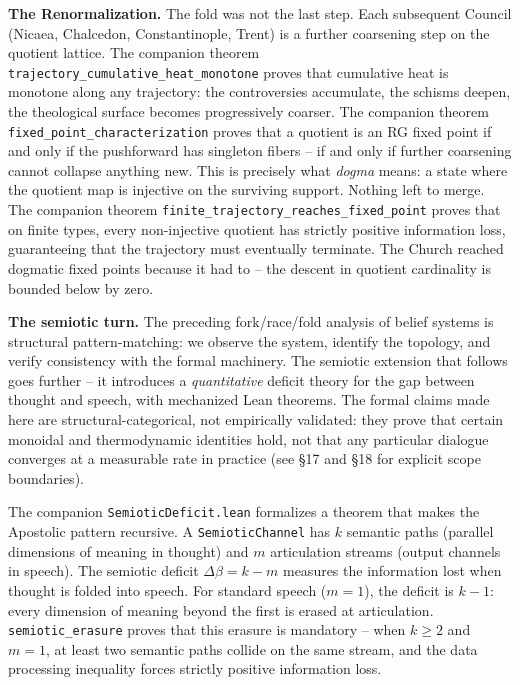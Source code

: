 \documentclass[
  11pt,
]{article}
\begin{document}
\textbf{The Renormalization.} The fold was not the last step. Each
subsequent Council (Nicaea, Chalcedon, Constantinople, Trent) is a
further coarsening step on the quotient lattice. The companion theorem
\texttt{trajectory\_cumulative\_heat\_monotone} proves that cumulative
heat is monotone along any trajectory: the controversies accumulate, the
schisms deepen, the theological surface becomes progressively coarser.
The companion theorem \texttt{fixed\_point\_characterization} proves
that a quotient is an RG fixed point if and only if the pushforward has
singleton fibers -- if and only if further coarsening cannot collapse
anything new. This is precisely what \emph{dogma} means: a state where
the quotient map is injective on the surviving support. Nothing left to
merge. The companion theorem
\texttt{finite\_trajectory\_reaches\_fixed\_point} proves that on finite
types, every non-injective quotient has strictly positive information
loss, guaranteeing that the trajectory must eventually terminate. The
Church reached dogmatic fixed points because it had to -- the descent in
quotient cardinality is bounded below by zero.

\textbf{The semiotic turn.} The preceding fork/race/fold analysis of
belief systems is structural pattern-matching: we observe the system,
identify the topology, and verify consistency with the formal machinery.
The semiotic extension that follows goes further -- it introduces a
\emph{quantitative} deficit theory for the gap between thought and
speech, with mechanized Lean theorems. The formal claims made here are
structural-categorical, not empirically validated: they prove that
certain monoidal and thermodynamic identities hold, not that any
particular dialogue converges at a measurable rate in practice (see §17
and §18 for explicit scope boundaries).

The companion \texttt{SemioticDeficit.lean} formalizes a theorem that
makes the Apostolic pattern recursive. A \texttt{SemioticChannel} has
\(k\) semantic paths (parallel dimensions of meaning in thought) and
\(m\) articulation streams (output channels in speech). The semiotic
deficit \(\Delta\beta = k - m\) measures the information lost when
thought is folded into speech. For standard speech (\(m = 1\)), the
deficit is \(k - 1\): every dimension of meaning beyond the first is
erased at articulation. \texttt{semiotic\_erasure} proves that this
erasure is mandatory -- when \(k \geq 2\) and \(m = 1\), at least two
semantic paths collide on the same stream, and the data processing
inequality forces strictly positive information loss.
\end{document}
